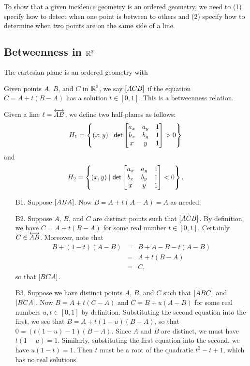 To show that a given incidence geometry is an ordered geometry, we need to (1) specify how to detect when one point is between to others and (2) specify how to determine when two points are on the same side of a line.

\subsection{Betweenness in $\mathbb{R}^2$}

\begin{prop}
The cartesian plane is an ordered geometry with 
\begin{proplist}
\item Given points $A$, $B$, and $C$ in $\mathbb{R}^2$, we say $[ A C B ]$ if the equation $C = A + t(B-A)$ has a solution $t \in [0,1]$. This is a betweenness relation.
\item Given a line $\ell = \overleftrightarrow{AB}$, we define two half-planes as follows: \[ H_1 = \left\{ (x, y) \mid \mathsf{det} \begin{bmatrix} a_x & a_y & 1 \\ b_x & b_y & 1 \\ x & y & 1 \end{bmatrix} > 0 \right\} \] and \[ H_2 = \left\{ (x, y) \mid \mathsf{det} \begin{bmatrix} a_x & a_y & 1 \\ b_x & b_y & 1 \\ x & y & 1 \end{bmatrix} < 0 \right\}. \]
\end{proplist}
\end{prop}


\begin{itemize}
\item[B1.] Suppose $[ A B A ]$. Now $B = A + t(A - A) = A$ as needed.
\item[B2.] Suppose $A$, $B$, and $C$ are distinct points such that $[ A C B ]$. By definition, we have $C = A + t(B-A)$ for some real number $t \in [0,1]$. Certainly $C \in \overleftrightarrow{AB}$. Moreover, note that
\begin{eqnarray*}
B + (1-t)(A-B) & = & B + A - B - t(A-B) \\
 & = & A + t(B-A) \\
 & = & C,
\end{eqnarray*}
so that $[ B C A ]$.
\item[B3.] Suppose we have distinct points $A$, $B$, and $C$ such that $[ A B C ]$ and $[ B C A ]$.
Now $B = A + t(C-A)$ and $C = B + u(A-B)$ for some real numbers $u,t \in [0,1]$ by definition.
Substituting the second equation into the first, we see that $B = A + t(1-u)(B - A)$, so that $0 = (t(1-u) - 1)(B - A)$. Since $A$ and $B$ are distinct, we must have $t(1-u) = 1$. Similarly, substituting the first equation into the second, we have $u(1-t) = 1$. Then $t$ must be a root of the quadratic $t^2 - t + 1$, which has no real solutions.
\end{itemize}

